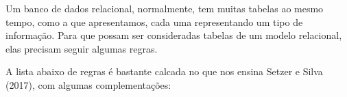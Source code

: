 \documentclass[
12pt,		%
openright,	%
twoside,  %
a4paper,			%
chapter=TITLE,		%
english,			%
french,				%
spanish,			%
brazil				%
]{USPSC-classe/USPSC}
\begin{document}
Um banco de dados relacional, normalmente, tem muitas tabelas ao mesmo tempo, como a que apresentamos, cada uma representando um tipo de informa\c{c}\~ao. Para que possam ser consideradas tabelas de um modelo relacional, elas precisam seguir algumas regras.

















A lista abaixo de regras \'e bastante calcada no que nos ensina  Setzer e Silva (2017), com algumas complementa\c{c}\~oes:
\end{document}

